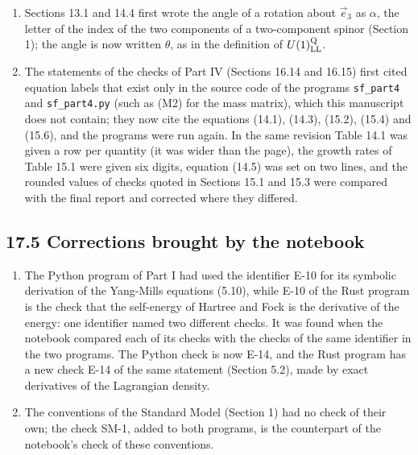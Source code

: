 \documentclass[
  10pt,
]{article}
\providecommand{\tightlist}{%
  \setlength{\itemsep}{0pt}\setlength{\parskip}{0pt}}
\begin{document}
\begin{enumerate}
  \emph{check P4-W7}). A differential-algebraic system arises when the
  time component of the gauge field is kept as an unknown, as in the
  unitary gauge of Section 15.4. Section 6.2 now says so.
\item
  Sections 13.1 and 14.4 first wrote the angle of a rotation about
  \(\vec e_3\) as \(\alpha\), the letter of the index of the two
  components of a two-component spinor (Section 1); the angle is now
  written \(\theta\), as in the definition of \(U(1)^{\rm Q}_{\rm LL}\).
\item
  The statements of the checks of Part IV (Sections 16.14 and 16.15)
  first cited equation labels that exist only in the source code of the
  programs \texttt{sf\_part4} and \texttt{sf\_part4.py} (such as (M2)
  for the mass matrix), which this manuscript does not contain; they now
  cite the equations (14.1), (14.3), (15.2), (15.4) and (15.6), and the
  programs were run again. In the same revision Table 14.1 was given a
  row per quantity (it was wider than the page), the growth rates of
  Table 15.1 were given six digits, equation (14.5) was set on two
  lines, and the rounded values of checks quoted in Sections 15.1 and
  15.3 were compared with the final report and corrected where they
  differed.
\end{enumerate}

\hypertarget{corrections-brought-by-the-notebook}{%
\subsection{17.5 Corrections brought by the
notebook}\label{corrections-brought-by-the-notebook}}

\begin{enumerate}
\def\labelenumi{\arabic{enumi}.}
\tightlist
\item
  The Python program of Part I had used the identifier E-10 for its
  symbolic derivation of the Yang-Mills equations (5.10), while E-10 of
  the Rust program is the check that the self-energy of Hartree and Fock
  is the derivative of the energy: one identifier named two different
  checks. It was found when the notebook compared each of its checks
  with the checks of the same identifier in the two programs. The Python
  check is now E-14, and the Rust program has a new check E-14 of the
  same statement (Section 5.2), made by exact derivatives of the
  Lagrangian density.
\item
  The conventions of the Standard Model (Section 1) had no check of
  their own; the check SM-1, added to both programs, is the counterpart
  of the notebook's check of these conventions.
\end{enumerate}
\end{document}
